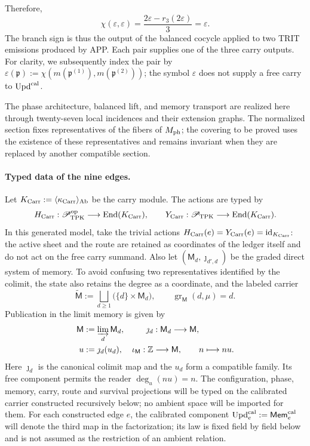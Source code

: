 Therefore,
\begin{equation}
 \chi(\varepsilon,\varepsilon)
 =\frac{2\varepsilon-r_3(2\varepsilon)}3=\varepsilon.
 \label{hmtfg:eq:carry-no-parametrico-ch}
\end{equation}
The branch sign is thus the output of the balanced cocycle applied to two TRIT
emissions produced by APP. Each pair supplies one of the three carry outputs.
For clarity, we subsequently index the pair by
\(\varepsilon(\mathfrak p):=
\chi(m(\mathfrak p^{(1)}),m(\mathfrak p^{(2)}))\); the symbol
\(\varepsilon\) does not supply a free carry to \(\operatorname{Upd}^{\rm cal}\).

The phase architecture, balanced lift, and memory transport are realized here
through twenty-seven local incidences and their extension graphs. The
normalized section fixes representatives of the fibers of \(M_{\rm ph}\); the
covering to be proved uses the existence of these representatives and remains
invariant when they are replaced by another compatible section.

\paragraph{Typed data of the nine edges.}
Let \(K_{\rm Carr}:=\langle\kappa_{\rm Carr}\rangle_{\rm Ab}\) be the carry
module. The actions are typed by
\[
 H_{\rm Carr}:\mathscr P_{\rm TPK}^{\rm op}
   \longrightarrow\operatorname{End}(K_{\rm Carr}),\qquad
 Y_{\rm Carr}:\mathscr P_{\rm TPK}
   \longrightarrow\operatorname{End}(K_{\rm Carr}).
\]
In this generated model, take the trivial actions
\(H_{\rm Carr}(e)=Y_{\rm Carr}(e)=\operatorname{id}_{K_{\rm Carr}}\): the
active sheet and the route are retained as coordinates of the ledger itself
and do not act on the free carry summand. Also let
\((\mathsf M_d,\jmath_{d',d})\) be the graded direct system of memory. To
avoid confusing two representatives identified by the colimit, the state also
retains the degree as a coordinate, and the labeled carrier
\[
 \widetilde{\mathsf M}:=
 \bigsqcup_{d\ge1}\bigl(\{d\}\times\mathsf M_d\bigr),
 \qquad
 \operatorname{gr}_{\mathsf M}(d,\mu)=d.
\]
Publication in the limit memory is given by
\[
\begin{aligned}
 \mathsf M&:=\varinjlim_d\mathsf M_d,&
 \jmath_d&:\mathsf M_d\longrightarrow\mathsf M,\\
 u&:=\jmath_d(u_d),&
 \iota_{\mathsf M}:\mathbb Z&\longrightarrow\mathsf M,
 \qquad n\longmapsto nu .
\end{aligned}
\]
Here \(\jmath_d\) is the canonical colimit map and the \(u_d\) form a
compatible family. Its free component permits
the reader \(\deg_u(nu)=n\).
The configuration, phase, memory, carry, route and
survival projections will be typed on the calibrated carrier constructed
recursively below; no ambient space will be imported for them.
For each constructed edge \(e\), the
calibrated component
\(\operatorname{Upd}^{\rm cal}_e:=\mathsf{Mem}^{\rm cal}_e\) will denote the
third map in the factorization; its law is fixed field by field
below and is not assumed as the restriction of an ambient relation.

